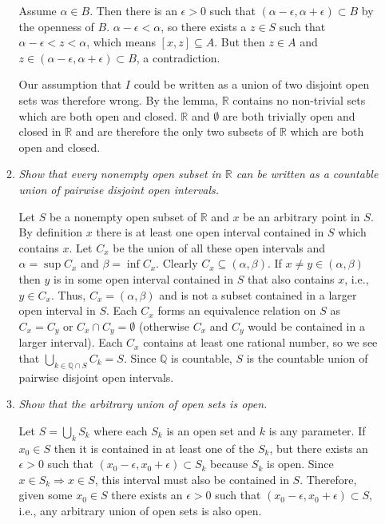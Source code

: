 \documentclass[11pt]{article}
\begin{document}
\begin{enumerate}
\begin{enumerate}
Assume $\alpha \in B$. Then there is an $\epsilon > 0$ such that $(\alpha - \epsilon, \alpha + \epsilon) \subset B$ by the openness of $B$.  $\alpha - \epsilon < \alpha$, so there exists a $z \in S$ such that $\alpha - \epsilon < z < \alpha$, which means $[x,z] \subseteq A$.  But then $z \in A$ and $z \in (\alpha - \epsilon, \alpha + \epsilon) \subset B$, a contradiction.

Our assumption that $I$ could be written as a union of two disjoint open sets was therefore wrong.  By the lemma, $\mathbb{R}$ contains no non-trivial sets which are both open and closed.  $\mathbb{R}$ and $\emptyset$ are both trivially open and closed in $\mathbb{R}$ and are therefore the only two subsets of $\mathbb{R}$ which are both open and closed.

\item \emph{Show that every nonempty open subset in $\mathbb{R}$ can be written as a countable union of pairwise disjoint open intervals.}

Let $S$ be a nonempty open subset of $\mathbb{R}$ and $x$ be an arbitrary point in $S$.  By definition $x$ there is at least one open interval contained in $S$ which contains $x$.  Let $C_x$ be the union of all these open intervals and $\alpha = \sup C_x$ and $\beta = \inf C_x$.  Clearly $C_x \subseteq (\alpha,\beta)$.  If $x \neq y  \in (\alpha,\beta)$ then $y$ is in some open interval contained in $S$ that also contains $x$, i.e., $y \in C_x$.  Thus, $C_x = (\alpha,\beta)$ and is not a subset contained in a larger open interval in $S$.  Each $C_x$ forms an equivalence relation on $S$ as $C_x = C_y$ or $C_x \cap C_y = \emptyset$ (otherwise $C_x$ and $C_y$ would be contained in a larger interval).  Each $C_x$ contains at least one rational number, so we see that $\bigcup_{k \in \mathbb{Q} \cap S}C_k = S$.  Since $\mathbb{Q}$ is countable, $S$ is the countable union of pairwise disjoint open intervals.

\item \emph{Show that the arbitrary union of open sets is open.}

Let $S = \bigcup_{k}S_k$ where each $S_k$ is an open set and $k$ is any parameter.  If $x_0 \in S$ then it is contained in at least one of the $S_k$, but there exists an $\epsilon > 0$ such that $(x_0 - \epsilon, x_0 + \epsilon) \subset S_k$ because $S_k$ is open.  Since $x \in S_k \Rightarrow x \in S$, this interval must also be contained in $S$. Therefore, given some $x_0 \in S$ there exists an $\epsilon > 0$ such that $(x_0 - \epsilon, x_0 + \epsilon) \subset S$, i.e., any arbitrary union of open sets is also open.


\end{enumerate}
\end{enumerate}
\end{document}
